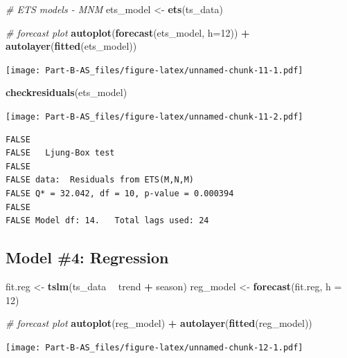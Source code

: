 \documentclass[openany]{book}
\newenvironment{Shaded}{\begin{snugshade}}{\end{snugshade}}
\newcommand{\KeywordTok}[1]{\textcolor[rgb]{0.13,0.29,0.53}{\textbf{#1}}}
\newcommand{\DataTypeTok}[1]{\textcolor[rgb]{0.13,0.29,0.53}{#1}}
\newcommand{\DecValTok}[1]{\textcolor[rgb]{0.00,0.00,0.81}{#1}}
\newcommand{\StringTok}[1]{\textcolor[rgb]{0.31,0.60,0.02}{#1}}
\newcommand{\CommentTok}[1]{\textcolor[rgb]{0.56,0.35,0.01}{\textit{#1}}}
\newcommand{\OperatorTok}[1]{\textcolor[rgb]{0.81,0.36,0.00}{\textbf{#1}}}
\newcommand{\NormalTok}[1]{#1}
\begin{document}
\begin{Shaded}
\begin{Highlighting}[]
\CommentTok{# ETS models - MNM}
\NormalTok{ets_model <-}\StringTok{ }\KeywordTok{ets}\NormalTok{(ts_data)}

\CommentTok{# forecast plot}
\KeywordTok{autoplot}\NormalTok{(}\KeywordTok{forecast}\NormalTok{(ets_model, }\DataTypeTok{h=}\DecValTok{12}\NormalTok{)) }\OperatorTok{+}\StringTok{ }\KeywordTok{autolayer}\NormalTok{(}\KeywordTok{fitted}\NormalTok{(ets_model))}
\end{Highlighting}
\end{Shaded}

\texttt{[image: Part-B-AS\_files/figure-latex/unnamed-chunk-11-1.pdf]}

\begin{Shaded}
\begin{Highlighting}[]
\KeywordTok{checkresiduals}\NormalTok{(ets_model)}
\end{Highlighting}
\end{Shaded}

\texttt{[image: Part-B-AS\_files/figure-latex/unnamed-chunk-11-2.pdf]}

\begin{verbatim}
FALSE 
FALSE   Ljung-Box test
FALSE 
FALSE data:  Residuals from ETS(M,N,M)
FALSE Q* = 32.042, df = 10, p-value = 0.000394
FALSE 
FALSE Model df: 14.   Total lags used: 24
\end{verbatim}

\subsection{Model \#4: Regression}\label{model-4-regression}

\begin{Shaded}
\begin{Highlighting}[]
\NormalTok{fit.reg <-}\StringTok{ }\KeywordTok{tslm}\NormalTok{(ts_data }\OperatorTok{~}\StringTok{ }\NormalTok{trend }\OperatorTok{+}\StringTok{ }\NormalTok{season)}
\NormalTok{reg_model <-}\StringTok{ }\KeywordTok{forecast}\NormalTok{(fit.reg, }\DataTypeTok{h =} \DecValTok{12}\NormalTok{)}

\CommentTok{# forecast plot}
\KeywordTok{autoplot}\NormalTok{(reg_model) }\OperatorTok{+}\StringTok{ }\KeywordTok{autolayer}\NormalTok{(}\KeywordTok{fitted}\NormalTok{(reg_model))}
\end{Highlighting}
\end{Shaded}

\texttt{[image: Part-B-AS\_files/figure-latex/unnamed-chunk-12-1.pdf]}
\end{document}
